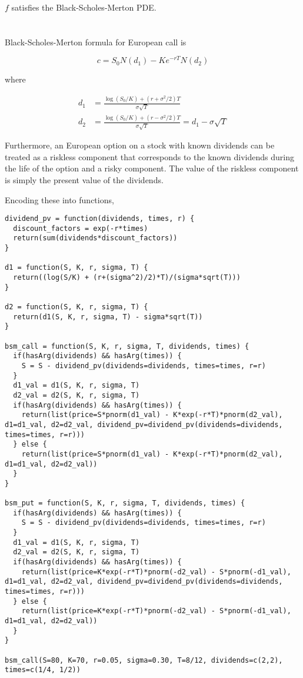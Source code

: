 \documentclass[11pt]{scrartcl}
\begin{document}
$f$ satisfies the Black-Scholes-Merton PDE.

\section{}

Black-Scholes-Merton formula for European call is

\[c = S_0N(d_1) - Ke^{-rT}N(d_2)\]

where

\begin{align*}
d_1 &= \frac{\log{(S_0 / K)} + (r+\sigma^2/2)T}{\sigma\sqrt{T}} \\
d_2 &= \frac{\log{(S_0 / K)} + (r-\sigma^2/2)T}{\sigma\sqrt{T}} = d_1 - \sigma\sqrt{T}
\end{align*}

Furthermore, an European option on a stock with known dividends can be treated as a riskless component that corresponds to the known dividends during the life of the option and a risky component. The value of the riskless component is simply the present value of the dividends.

Encoding these into functions,

\begin{lstlisting}
dividend_pv = function(dividends, times, r) {
  discount_factors = exp(-r*times)
  return(sum(dividends*discount_factors))
}

d1 = function(S, K, r, sigma, T) {
  return((log(S/K) + (r+(sigma^2)/2)*T)/(sigma*sqrt(T)))
}

d2 = function(S, K, r, sigma, T) {
  return(d1(S, K, r, sigma, T) - sigma*sqrt(T))
}

bsm_call = function(S, K, r, sigma, T, dividends, times) {
  if(hasArg(dividends) && hasArg(times)) {
    S = S - dividend_pv(dividends=dividends, times=times, r=r)
  }
  d1_val = d1(S, K, r, sigma, T)
  d2_val = d2(S, K, r, sigma, T)
  if(hasArg(dividends) && hasArg(times)) {
    return(list(price=S*pnorm(d1_val) - K*exp(-r*T)*pnorm(d2_val), d1=d1_val, d2=d2_val, dividend_pv=dividend_pv(dividends=dividends, times=times, r=r)))
  } else {
    return(list(price=S*pnorm(d1_val) - K*exp(-r*T)*pnorm(d2_val), d1=d1_val, d2=d2_val))
  }
}

bsm_put = function(S, K, r, sigma, T, dividends, times) {
  if(hasArg(dividends) && hasArg(times)) {
    S = S - dividend_pv(dividends=dividends, times=times, r=r)
  }
  d1_val = d1(S, K, r, sigma, T)
  d2_val = d2(S, K, r, sigma, T)
  if(hasArg(dividends) && hasArg(times)) {
    return(list(price=K*exp(-r*T)*pnorm(-d2_val) - S*pnorm(-d1_val), d1=d1_val, d2=d2_val, dividend_pv=dividend_pv(dividends=dividends, times=times, r=r)))
  } else {
    return(list(price=K*exp(-r*T)*pnorm(-d2_val) - S*pnorm(-d1_val), d1=d1_val, d2=d2_val))
  }
}

bsm_call(S=80, K=70, r=0.05, sigma=0.30, T=8/12, dividends=c(2,2), times=c(1/4, 1/2))
\end{lstlisting}
\end{document}
